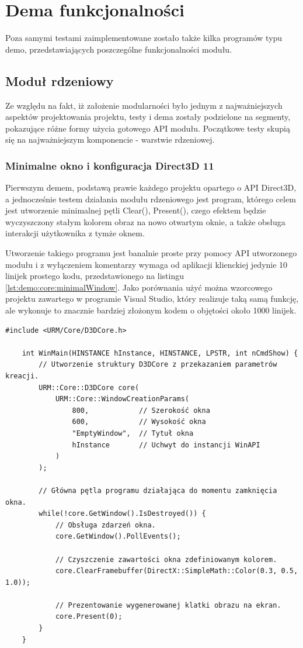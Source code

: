 \chapter{Dema funkcjonalności}
Poza samymi testami zaimplementowane zostało także kilka programów typu demo, przedstawiających poszczególne funkcjonalności modułu.

\section{Moduł rdzeniowy}
Ze względu na fakt, iż założenie modularności było jednym z najważniejszych aspektów projektowania projektu, testy i dema zostały podzielone na segmenty, pokazujące różne formy użycia gotowego API modułu. Początkowe testy skupią się na najważniejszym komponencie - warstwie rdzeniowej.

\subsection{Minimalne okno i konfiguracja Direct3D 11}
Pierwszym demem, podstawą prawie każdego projektu opartego o API Direct3D, a jednocześnie testem działania modułu rdzeniowego jest program, którego celem jest utworzenie minimalnej pętli Clear(), Present(), czego efektem będzie wyczyszczony stałym kolorem obraz na nowo otwartym oknie, a także obsługa interakcji użytkownika z tymże oknem.

Utworzenie takiego programu jest banalnie proste przy pomocy API utworzonego modułu i z wyłączeniem komentarzy wymaga od aplikacji klienckiej jedynie 10 linijek prostego kodu, przedstawionego na listingu \ref{lst:demo:core:minimalWindow}. Jako porównania użyć można wzorcowego projektu zawartego w programie Visual Studio, który realizuje taką samą funkcję, ale wykonuje to znacznie bardziej złożonym kodem o objętości około 1000 linijek.

\vfill

\begin{lstlisting}[caption={Pełny kod programu wykorzystującego API modułu do utworzenia minimalnego okna.}, label={lst:demo:core:minimalWindow}]
	#include <URM/Core/D3DCore.h>
	
	int WinMain(HINSTANCE hInstance, HINSTANCE, LPSTR, int nCmdShow) {
		// Utworzenie struktury D3DCore z przekazaniem parametrów kreacji. 
		URM::Core::D3DCore core(
			URM::Core::WindowCreationParams(
				800,            // Szerokość okna
				600,            // Wysokość okna
				"EmptyWindow",  // Tytuł okna
				hInstance       // Uchwyt do instancji WinAPI
			)
		);
	    
		// Główna pętla programu działająca do momentu zamknięcia okna.
		while(!core.GetWindow().IsDestroyed()) {
			// Obsługa zdarzeń okna.
			core.GetWindow().PollEvents();

			// Czyszczenie zawartości okna zdefiniowanym kolorem.
			core.ClearFramebuffer(DirectX::SimpleMath::Color(0.3, 0.5, 1.0));

			// Prezentowanie wygenerowanej klatki obrazu na ekran.
			core.Present(0);
		}
	}
\end{lstlisting}

